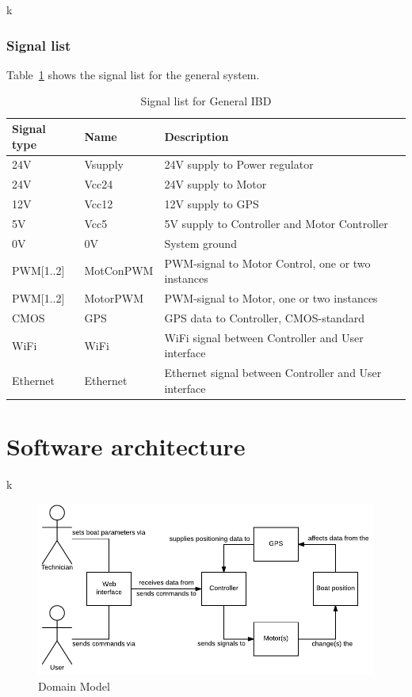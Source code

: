 k

\subsubsection{Signal list}

Table~\ref*{table: General IBD} shows the signal list for the general system.
\begin{table}[htbp]
	\centering
	\begin{tabular}{|l|l|l|}
		\hline
		\textbf{Signal type} 	&\textbf{Name}		&\textbf{Description} \\\hline
		24V			&Vsupply	&24V supply to Power regulator\\\hline
		
		24V			&Vcc24		&24V supply to Motor\\\hline
		12V			&Vcc12		&12V supply to GPS\\\hline
		5V			&Vcc5		&5V supply to Controller and Motor Controller\\\hline
		0V			&0V			&System ground\\\hline
		PWM[1..2]	&MotConPWM	&PWM-signal to Motor Control, one or two instances\\\hline
		PWM[1..2]	&MotorPWM	&PWM-signal to Motor, one or two instances\\\hline
		CMOS		&GPS		&GPS data to Controller, CMOS-standard\\\hline	
		WiFi		&WiFi		&WiFi signal between Controller and User interface\\\hline
		Ethernet	&Ethernet	&Ethernet signal between Controller and User interface\\\hline
		
		
	\end{tabular}
	\caption{Signal list for General IBD}
	\label{table: General IBD}
\end{table}

\section{Software architecture}
k

\begin{figure}[H]
	\centering
	\includegraphics[width=1\linewidth]{Images/System_architecture/Domain_Model}
	\caption{Domain Model}
\end{figure}

